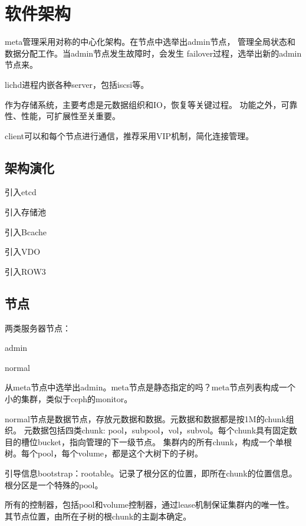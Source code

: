 \chapter{软件架构}

meta管理采用对称的中心化架构。在节点中选举出admin节点，
管理全局状态和数据分配工作。当admin节点发生故障时，会发生
failover过程，选举出新的admin节点来。

lichd进程内嵌各种server，包括iscsi等。

作为存储系统，主要考虑是元数据组织和IO，恢复等关键过程。
功能之外，可靠性、性能，可扩展性至关重要。

client可以和每个节点进行通信，推荐采用VIP机制，简化连接管理。

\section{架构演化}

\begin{enumbox}
\item{引入etcd}
\item{引入存储池}
\item{引入Bcache}
\item{引入VDO}
\item{引入ROW3}
\end{enumbox}

\section{节点}

两类服务器节点：
\begin{compactenum}
\item admin
\item normal
\end{compactenum}

从meta节点中选举出admin。meta节点是静态指定的吗？meta节点列表构成一个小的集群，类似于ceph的monitor。

normal节点是数据节点，存放元数据和数据。元数据和数据都是按1M的chunk组织。
元数据包括四类chunk: pool，subpool，vol，subvol。每个chunk具有固定数目的槽位bucket，指向管理的下一级节点。
集群内的所有chunk，构成一个单根树。每个pool，每个volume，都是这个大树下的子树。

引导信息bootstrap：rootable。记录了根分区的位置，即所在chunk的位置信息。根分区是一个特殊的pool。

所有的控制器，包括pool和volume控制器，通过lease机制保证集群内的唯一性。
其节点位置，由所在子树的根chunk的主副本确定。

